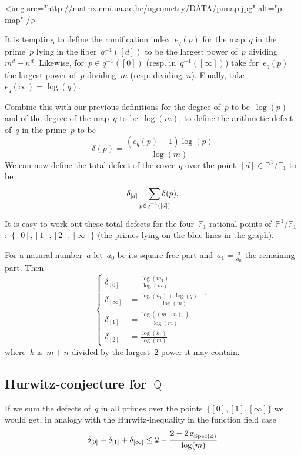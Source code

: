<img src="http://matrix.cmi.ua.ac.be/ngeometry/DATA/pimap.jpg" alt="pi-map" />

It is tempting to define the ramification index~$e_q(p)$ for the map~$q$ in the prime~$p$ lying in the fiber~$q^{-1}([d])$ to be the largest power of~$p$ dividing~$m^d-n^d$. Likewise, for~$p \in q^{-1}([0])$ (resp. in~$q^{-1}([\infty])$) take for~$e_q(p)$ the largest power of~$p$ dividing~$m$ (resp. dividing~$n$). Finally, take~$e_q(\infty) = \log(q)$.

Combine this with our previous definitions for the degree of~$p$ to be~$\log(p)$ and of the degree of the map~$q$ to be~$\log(m)$, to define the arithmetic defect of~$q$ in the prime~$p$ to be
\begin{equation}
  \delta(p) = \frac{(e_q(p)-1) \log(p)}{\log(m)}
\end{equation}
We can now define the total defect of the cover~$q$ over the point~$[d] \in \mathbb{P}^1 / \mathbb{F}_1$ to be
\begin{equation}
  \delta_{[d]} = \sum_{\mathclap{p \in q^{-1}([d])}} \delta(p).
\end{equation}

It is easy to work out these total defects for the four~$\mathbb{F}_1$-rational points of~$\mathbb{P}^1 / \mathbb{F}_1$:~$\{ [0],[1],[2],[\infty] \}$ (the primes lying on the blue lines in the graph). 

For a natural number~$a$ let~$a_0$ be its square-free part and~$a_1 = \tfrac{a}{a_0}$ the remaining part. Then
\begin{equation}
  \left\{
  \begin{aligned}
	  \delta_{[0]} &= \frac{\log(m_1)}{\log(m)} \\
	  \delta_{[\infty]} &= \frac{\log(n_1)+\log(q)-1}{\log(m)} \\
	  \delta_{[1]} &= \frac{\log((m-n)_1)}{\log(m)} \\
	  \delta_{[2]} &= \frac{\log(k_1)}{\log(m)}
  \end{aligned}
  \right.
\end{equation}
where~$k$ is~$m+n$ divided by the largest~$2$-power it may contain. 

\subsection{Hurwitz-conjecture for~$\mathbb{Q}$}

If we sum the defects of~$q$ in all primes over the points~$\{ [0],[1],[\infty] \}$ we would get, in analogy with the Hurwitz-inequality in the function field case
\begin{equation}
  \delta_{[0]}+\delta_{[1]}+\delta_{[\infty]} \leq 2 - \frac{2 - 2\operatorname{g}_{\operatorname{Spec}(\mathbb{Z})}}{\log(m)}
\end{equation}

